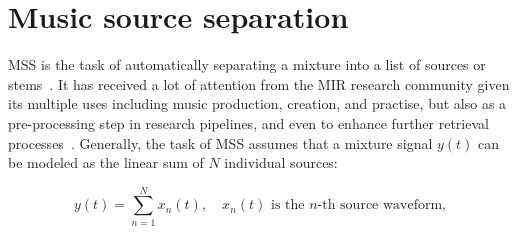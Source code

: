 



%
%



\section{Music source separation}\label{ch02_sb:sec:music-source-separation}
\acrfull{MSS} is the task of automatically separating a mixture into a list of sources or stems~\citep{jansson-unet}. It has received a lot of attention from the \acrshort{MIR} research community given its multiple uses including music production, creation, and practise, but also as a pre-processing step in research pipelines, and even to enhance further retrieval processes~\citep{cortes-enhanced}. Generally, the task of \acrshort{MSS} assumes that a mixture signal $y(t)$ can be modeled as the linear sum of $N$ individual sources:

\begin{equation}\label{eq:mix_mss}
    y(t) = \sum_{n=1}^{N} x_n(t), \quad x_n(t) \text{ is the }n\text{-th source waveform,}
\end{equation}

